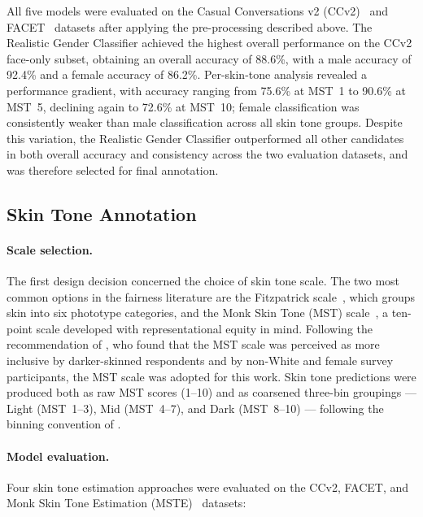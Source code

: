All five models were evaluated on the Casual Conversations v2 (CCv2)~\cite{hazirbas2022ccv2} and FACET~\cite{gustafson2023facet} datasets after applying the pre-processing described above. The Realistic Gender Classifier achieved the highest overall performance on the CCv2 face-only subset, obtaining an overall accuracy of 88.6\%, with a male accuracy of 92.4\% and a female accuracy of 86.2\%. Per-skin-tone analysis revealed a performance gradient, with accuracy ranging from 75.6\% at MST~1 to 90.6\% at MST~5, declining again to 72.6\% at MST~10; female classification was consistently weaker than male classification across all skin tone groups. Despite this variation, the Realistic Gender Classifier outperformed all other candidates in both overall accuracy and consistency across the two evaluation datasets, and was therefore selected for final annotation.

\subsection{Skin Tone Annotation}
\label{sec:skintone_annotation}

\paragraph{Scale selection.}
The first design decision concerned the choice of skin tone scale. The two most common options in the fairness literature are the Fitzpatrick scale~\cite{fitzpatrick1988skin}, which groups skin into six phototype categories, and the Monk Skin Tone (MST) scale~\cite{monk2023monk}, a ten-point scale developed with representational equity in mind. Following the recommendation of \cite{schumann2023consensus}, who found that the MST scale was perceived as more inclusive by darker-skinned respondents and by non-White and female survey participants, the MST scale was adopted for this work. Skin tone predictions were produced both as raw MST scores (1--10) and as coarsened three-bin groupings — Light (MST~1--3), Mid (MST~4--7), and Dark (MST~8--10) — following the binning convention of \cite{wu2023skintone}.

\paragraph{Model evaluation.}
Four skin tone estimation approaches were evaluated on the CCv2, FACET, and Monk Skin Tone Estimation (MSTE)~\cite{wu2023skintone} datasets:

